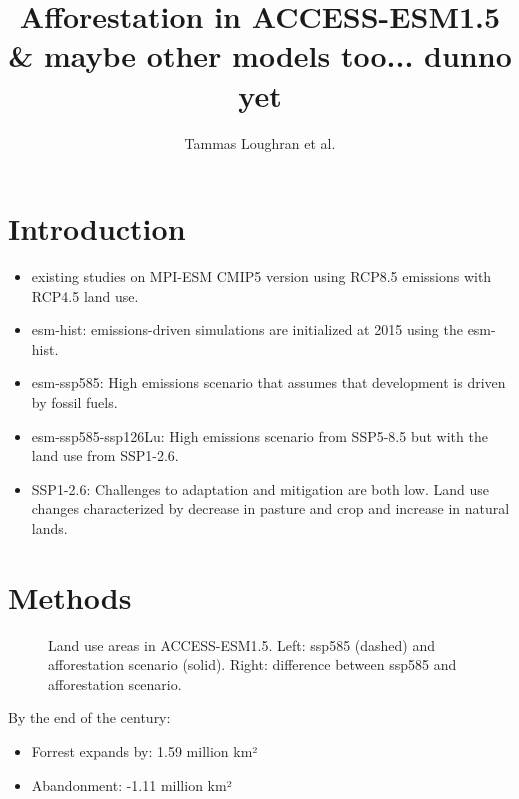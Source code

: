 \documentclass[]{article}
\title{Afforestation in ACCESS-ESM1.5 \& maybe other models too... dunno yet}
\author{Tammas Loughran et al.}
\begin{document}
\maketitle

\section{Introduction}

\begin{itemize}
    \item existing studies on MPI-ESM CMIP5 version using RCP8.5 emissions with RCP4.5 land use. \cite{sonntag_reforestation_2016} \cite{sonntag_quantifying_2018}

    \item esm-hist: emissions-driven simulations are initialized at 2015 using the esm-hist. \cite{eyring_overview_2016}
    \item esm-ssp585: High emissions scenario that assumes that development is driven by fossil fuels. \cite{oneill_scenario_2016}
    \item esm-ssp585-ssp126Lu: High emissions scenario from SSP5-8.5 but with the land use from SSP1-2.6. \cite{lawrence_land_2016}
    \item SSP1-2.6: Challenges to adaptation and mitigation are both low. Land use changes characterized by decrease in pasture and crop and increase in natural lands. \cite{van_vuuren_energy_2017}
\end{itemize}

\section{Methods}

\begin{figure}[!h]
    \centering
    \begin{subfigure}[b]{0.45\linewidth}
        
    \end{subfigure}
    \begin{subfigure}[b]{0.45\linewidth}
        
    \end{subfigure}
    \caption{Land use areas in ACCESS-ESM1.5. Left: ssp585 (dashed) and afforestation scenario (solid). Right: difference between ssp585 and afforestation scenario.}
    \label{fig:land_use}
\end{figure}

By the end of the century:
\begin{itemize}
    \item Forrest expands by: 1.59 million km²
    \item Abandonment: -1.11 million km²
\end{itemize}
\end{document}
